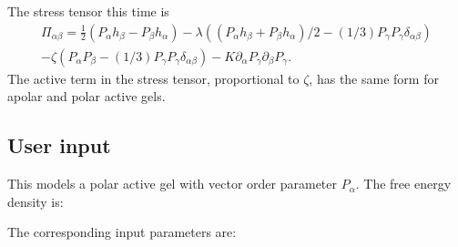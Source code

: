 The stress tensor this time is 
\begin{eqnarray}
\Pi_{\alpha\beta} =
\frac{1}{2}\left(P_\alpha h_\beta - P_\beta h_\alpha \right)
- \lambda\left( (P_\alpha h_\beta + P_\beta h_\alpha)/2 
- (1/3)P_\gamma P_\gamma \delta_{\alpha\beta} \right)
\\
-  \zeta ( P_\alpha P_\beta - (1/3)P_\gamma P_\gamma \delta_{\alpha\beta})
- K \partial_\alpha P_\gamma \partial_\beta P_\gamma.
\end{eqnarray}
The active term in the stress tensor, proportional
to $\zeta$, has the same form for apolar and polar active gels. 

\subsection{User input}


This models a polar active gel with vector order parameter $P_\alpha$.
The free energy density is:


The corresponding input parameters are:











